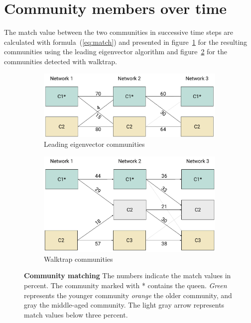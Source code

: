 \section{Community members over time}
The match value between the two communities in successive time steps are calculated with formula~(\ref{eq:match}) and presented in figure~\ref{fig:membersLE} for the resulting communities using the leading eigenvector algorithm and figure~\ref{fig:membersWT} for the communities detected with walktrap.

\begin{figure}[htb]
	\centering
	\begin{subfigure}[b]{1.0\textwidth}
	\centering
	\includegraphics[width=.8\textwidth]{Figures/membersLE}
	\caption[Leading eigenvector communities]{Leading eigenvector communities}
	\label{fig:membersLE}
	\vspace*{5mm}
	\end{subfigure} 
	\begin{subfigure}[b]{1.0\textwidth}
	\centering
	\includegraphics[width=.8\textwidth]{Figures/membersWT}
	\caption[Walktrap communities]{Walktrap communities}
	\label{fig:membersWT}
	\vspace*{5mm}
	\end{subfigure}
	\caption[Community matching]{\textbf{Community matching} The numbers indicate the match values in percent. The community marked with * contains the queen. \emph{Green} represents the younger community \emph{orange} the older community, and gray the middle-aged community. The light gray arrow represents match values below three percent.}
	\label{fig:members}
\end{figure}